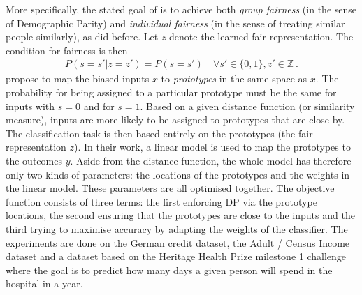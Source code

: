 More specifically, the stated goal of \citet{zemel2013learning} is to achieve both \emph{group
fairness} (in the sense of Demographic Parity) and \emph{individual fairness} (in the sense of
treating similar people similarly), as \citet{dwork2012fairness} did before. Let \(z\) denote the
learned fair representation. The condition for fairness is then \begin{align}
\label{eq:fair-representation} P(s=s'|z=z') = P(s=s') \quad \forall s' \in \{0, 1\}, z' \in
\mathbb{Z}~. \end{align} \citet{zemel2013learning} propose to map the biased inputs \(x\) to
\emph{prototypes} in the same space as \(x\). The probability for being assigned to a particular
prototype must be the same for inputs with \(s=0\) and for \(s=1\). Based on a given distance
function (or similarity measure), inputs are more likely to be assigned to prototypes that are
close-by. The classification task is then based entirely on the prototypes (the fair representation
\(z\)). In their work, a linear model is used to map the prototypes to the outcomes \(y\). Aside
from the distance function, the whole model has therefore only two kinds of parameters: the
locations of the prototypes and the weights in the linear model. These parameters are all optimised
together. The objective function consists of three terms: the first enforcing \acf{DP} via the
prototype locations, the second ensuring that the prototypes are close to the inputs and the third
trying to maximise accuracy by adapting the weights of the classifier.
%
The experiments are done on the German credit dataset, the Adult / Census Income dataset and a
dataset based on the Heritage Health Prize milestone 1 challenge~\citep{heritagehealth} where the
goal is to predict how many days a given person will spend in the hospital in a year.


